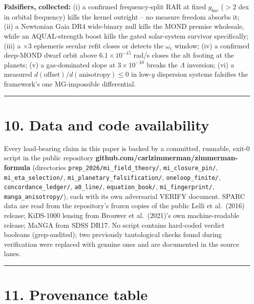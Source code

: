 \documentclass[
]{article}
\begin{document}
\textbf{Falsifiers, collected:} (i) a confirmed frequency-split RAR at
fixed \(g_{bar}\) (\(> 2\) dex in orbital frequency) kills the kernel
outright -- no measure freedom absorbs it; (ii) a Newtonian Gaia DR4
wide-binary null kills the MOND premise wholesale, while an
AQUAL-strength boost kills the gated solar-system survivor specifically;
(iii) a \(\times 3\) ephemeris secular refit closes or detects the
\(\omega_c\) window; (iv) a confirmed deep-MOND dwarf orbit above
\(6.1 \times 10^{-15}\) rad/s closes the alt footing at the planets; (v)
a gas-dominated slope at \(3 \times 10^{-10}\) breaks the \(\Lambda\)
inversion; (vi) a measured
\(d(\mathrm{offset})/d(\mathrm{anisotropy}) \le 0\) in low-\(y\)
dispersion systems falsifies the framework's one MG-impossible
differential.

\begin{center}\rule{0.5\linewidth}{0.5pt}\end{center}

\section{10. Data and code
availability}\label{data-and-code-availability}

Every load-bearing claim in this paper is backed by a committed,
runnable, exit-0 script in the public repository
\textbf{github.com/carlzimmerman/zimmerman-formula} (directories
\texttt{prep\_2026/mi\_field\_theory/}, \texttt{mi\_closure\_pin/},
\texttt{mi\_eta\_selection/}, \texttt{mi\_planetary\_falsification/},
\texttt{oneloop\_finite/}, \texttt{concordance\_ledger/},
\texttt{a0\_line/}, \texttt{equation\_book/}, \texttt{mi\_fingerprint/},
\texttt{manga\_anisotropy/}), each with its own adversarial VERIFY
document. SPARC data are read from the repository's frozen copies of the
public Lelli et al.~(2016) release; KiDS-1000 lensing from Brouwer et
al.~(2021)'s own machine-readable release; MaNGA from SDSS DR17. No
script contains hard-coded verdict booleans (grep-audited); two
previously tautological checks found during verification were replaced
with genuine ones and are documented in the source lanes.

\begin{center}\rule{0.5\linewidth}{0.5pt}\end{center}

\section{11. Provenance table}\label{provenance-table}
\end{document}
